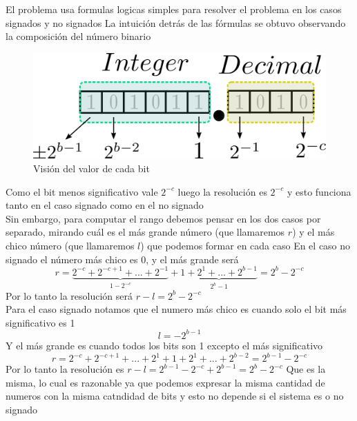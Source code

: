 El problema usa formulas logicas simples para resolver el problema en los casos signados y no signados
La intuición detrás de las fórmulas se obtuvo observando la composición del número binario
\begin{figure}[H]
  \begin{centering}
  \includegraphics[scale=1]{bits.png}
  \par\end{centering}
  \caption{Visión del valor de cada bit}
\end{figure}
Como el bit menos significativo vale $2^{-c}$ luego la resolución es $2^{-c}$ y esto funciona tanto en el caso signado como en el no signado
\\
Sin embargo, para computar el rango debemos pensar en los dos casos por separado, mirando cuál es el más grande número (que llamaremos $r$) y el más chico número (que llamaremos $l$) que podemos formar en cada caso
En el caso no signado el número más chico es 0, y el más grande será
$$r=\underbrace{2^{-c}+2^{-c+1}+...+2^{-1}}_{1-2^{-c}}+\underbrace{1+2^{1}+...+2^{b-1}}_{2^{b}-1}=2^{b}-2^{-c}$$
Por lo tanto la resolución será $r-l=2^{b}-2^{-c}$
\\
Para el caso signado notamos que el numero más chico es cuando solo el bit más significativo es 1
$$l=-2^{b-1} $$
Y el más grande es cuando todos los bits son 1 excepto el más significativo
$$r=2^{-c}+2^{-c+1}+...+2^{1}+1+2^{1}+...+2^{b-2}=2^{b-1}-2^{-c}$$
Por lo tanto la resolución es $r-l=2^{b-1}-2^{-c}+2^{b-1}=2^{b}-2^{-c}$
Que es la misma, lo cual es razonable ya que podemos expresar la misma cantidad de numeros con la misma catndidad de bits y esto no depende si el sistema es o no signado

